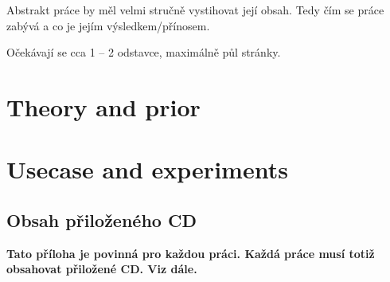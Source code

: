 \documentclass[11pt,twoside,a4paper]{book}
\begin{document}
	\baselineskip

	\noindent
	Abstrakt práce by měl velmi stručně vystihovat její obsah. Tedy čím se práce zabývá a co je jejím výsledkem/přínosem.

	\noindent
	Očekávají se cca 1 -- 2 odstavce, maximálně půl stránky.

	\tableofcontents		%

	\listoffigures			%
	\listoftables			%

	\mainbodystarts

	\part{Theory and prior}
	

	\part{Usecase and experiments}
	
	
	

	
	{
	
	}

	\appendix	

	\printnomenclature
	\label{apx:zkratky}

	\chapter{Obsah přiloženého CD}
	\textbf{\large Tato příloha je povinná pro každou práci. Každá práce musí totiž obsahovat přiložené CD. Viz dále.}

\end{document}
